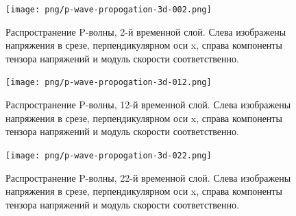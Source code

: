 \begin{figure}[htp]
\centering
\texttt{[image: png/p-wave-propogation-3d-002.png]}
\caption{Распространение P-волны, 2-й временной слой. Слева изображены
напряжения в срезе, перпендикулярном оси x, справа компоненты тензора напряжений
и модуль скорости соответственно.}
\label{pic:p_wave_2}
\end{figure}
\begin{figure}[htp]
\centering
\texttt{[image: png/p-wave-propogation-3d-012.png]}
\caption{Распространение P-волны, 12-й временной слой. Слева изображены
напряжения в срезе, перпендикулярном оси x, справа компоненты тензора напряжений
и модуль скорости соответственно.}
\label{pic:p_wave_12}
\end{figure}
\begin{figure}[htp]
\centering
\texttt{[image: png/p-wave-propogation-3d-022.png]}
\caption{Распространение P-волны, 22-й временной слой. Слева изображены
напряжения в срезе, перпендикулярном оси x, справа компоненты тензора напряжений
и модуль скорости соответственно.}
\label{pic:p_wave_22}
\end{figure}

\clearpage
\newpage

